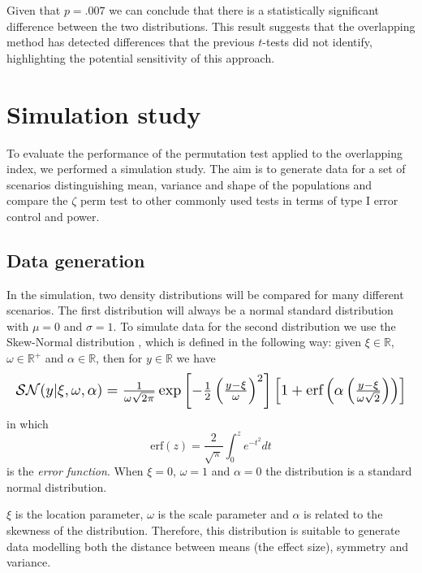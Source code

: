 \documentclass[twocolumn]{article}\usepackage[]{graphicx}\usepackage[]{xcolor}
\begin{document}
Given that $p = .007$ we can conclude that there is a statistically significant difference between the two distributions. This result suggests that the overlapping method has detected differences that the previous $t$-tests did not identify, highlighting the potential sensitivity of this approach.


\section{Simulation study}

To evaluate the performance of the permutation test applied to the overlapping index, we performed a simulation study. The aim is to generate data for a set of scenarios distinguishing mean, variance and shape of the populations and compare the $\zeta$ perm test to other commonly used tests in terms of type I error control and power. 

\subsection{Data generation}

In the simulation, two density distributions will be compared for many different scenarios. The first distribution will always be a normal standard distribution with $\mu = 0$ and $\sigma = 1$. 
To simulate data for the second distribution we use the Skew-Normal distribution \cite{azzalini:1985}, which is defined in the following way: given $\xi \in \mathbb{R}$, $\omega \in \mathbb{R}^{+}$ and $\alpha \in \mathbb{R}$, then for $y \in \mathbb{R}$ we have  
\begin{equation}
\resizebox{\columnwidth}{!}{$
\mathcal{SN}(y|\xi, \omega, \alpha) = \frac{1}{\omega \sqrt{2\pi}} \exp \left[ -\frac{1}{2} \left( \frac{y-\xi}{\omega} \right)^2  \right] \left[ 1+ \text{erf}\left( \alpha \left( \frac{y-\xi}{\omega\sqrt{2}}\right) \right) \right]
$}
\end{equation}
in which $$\text{erf}(z) = \frac{2}{\sqrt{\pi}} \int_{0}^{z} e^{-t^2} dt $$ is the \emph{error function}.
When $\xi = 0$, $\omega = 1$ and $\alpha = 0$ the distribution is a standard normal distribution.

$\xi$ is the location parameter, $\omega$ is the scale parameter and $\alpha$ is related to the skewness of the distribution. Therefore, this distribution is suitable to generate data modelling both the distance between means (the effect size), symmetry and variance.
\end{document}
